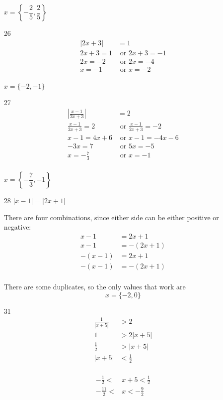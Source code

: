 \documentclass[fleqn,addpoints]{exam}
\begin{document}
\begin{itemize}
$x = \left \{ -\dfrac{2}{5}, \dfrac{2}{5} \right \}$

\item[26]
\begin{align*}
  |2x+3| & = 1 \\
  2x+3 = 1 & \text{ or } 2x + 3 = -1 \\
  2x = -2 & \text{ or } 2x = -4 \\
  x = -1 & \text{ or } x = -2 \\
\end{align*}

$x = \{-2, -1\}$

\item[27]
\begin{align*}
  \left| \frac{x-1}{2x+3} \right| & = 2 \\
  \frac{x-1}{2x+3} = 2 & \text{ or } \frac{x-1}{2x+3} = -2 \\
  x-1 = 4x+6 & \text{ or } x-1 = -4x-6 \\
  -3x = 7 & \text{ or } 5x = -5 \\
  x = -\frac{7}{3} & \text{ or } x = -1 \\
\end{align*}

$x = \left\{ -\dfrac{7}{3}, -1 \right\}$

\item[28]
$|x-1| = |2x+1|$

There are four combinations, since either side can be either positive or negative:
\begin{align*}
  x-1 &= 2x + 1  \\
  x-1 &= -(2x+1) \\
  -(x-1) &= 2x+1 \\ 
  -(x-1) & = -(2x+1) \\
\end{align*}

There are some duplicates, so the only values that work are 
\[
  x=\{-2, 0\}
\]

\item[31]
\begin{align*}
  \frac{1}{|x+5|} &> 2 \\
  1               &> 2|x+5| \\
  \frac{1}{2} &> |x+5| \\
  |x+5| &< \frac{1}{2} \\
\end{align*}

\begin{align*}
  -\frac{1}{2} < & x+5 < \frac{1}{2} \\
  -\frac{11}{2} < & x  < -\frac{9}{2}
\end{align*}


\end{itemize}
\end{document}
